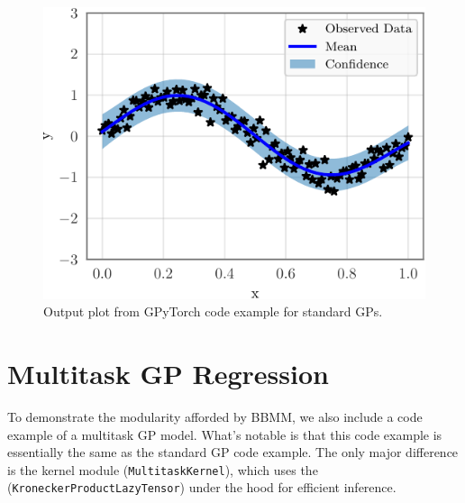 \longcodefalse

\begin{figure}[ht!]
  \centering
  \includegraphics[width=0.5\linewidth]{figures/example_gpytorch_plot.pdf}
  \caption{
    Output plot from GPyTorch code example for standard GPs.
  }
  \label{fig:example_gpytorch_plot}
\end{figure}







\section{Multitask GP Regression}
\label{app:multitask_gp_example}

To demonstrate the modularity afforded by BBMM, we also include a code example of a multitask GP model.
What's notable is that this code example is essentially the same as the standard GP code example.
The only major difference is the kernel module ({\tt MultitaskKernel}),
which uses the ({\tt KroneckerProductLazyTensor}) under the hood for efficient inference.


